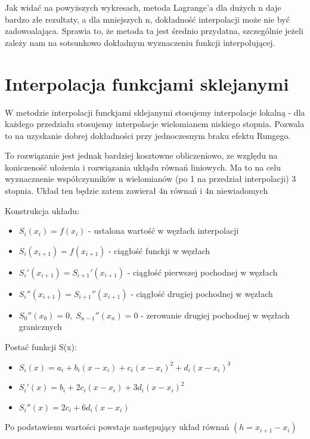 \documentclass[fleqn]{article}
\begin{document}
    \noindent Jak widać na powyższych wykresach, metoda Lagrange'a dla dużych n daje bardzo złe rezultaty, a dla mniejszych n, dokładność interpolacji może nie być zadowoalająca.
    Sprawia to, że metoda ta jest średnio przydatna, szczególnie jeżeli zależy nam na sotsunkowo dokładnym wyznaczeniu funkcji interpolującej.

\newpage
\section{Interpolacja funkcjami sklejanymi}
    W metodzie interpolacji funckjami sklejanymi stosujemy interpolacje lokalną - dla każdego przedziału stosujemy interpolacje wielomianem niskiego stopnia.
    Pozwala to na uzyskanie dobrej dokładności przy jednoczesnym braku efektu Rungego.

    \noindent To rozwiązanie jest jednak bardziej kosztowne obliczeniowo, ze względu na koniczeność ułożenia i rozwiązania ukłądu równań liniowych. 
    Ma to na celu wyznacznenie współczynników n wielomianów (po 1 na przedział interpolacji) 3 stopnia. Układ ten będzie zatem zawierał 4n równań i 4n niewiadomych

    \noindent Konstrukcja układu:
    \begin{itemize}
        \item $S_i(x_i) = f(x_i)$ - ustalona wartość w węzłach interpolacji
        \item $S_i(x_{i+1}) = f(x_{i+1})$ - ciągłość funckji w węzłach
        \item $S_i'(x_{i+1}) = S_{i+1}'(x_{i+1})$ - ciągłość pierwszej pochodnej w węzłach
        \item $S_i''(x_{i+1}) = S_{i+1}''(x_{i+1})$ - ciągłość drugiej pochodnej w węzłach
        \item $S_0''(x_0) = 0, \; S_{n-1}''(x_n) = 0 $ - zerowanie drugiej pochodnej w węzłach granicznych
    \end{itemize}

    \noindent Postać funkcji S(x):
    \begin{itemize}
        \item $S_i(x) = a_i + b_i(x - x_i) + c_i(x - x_i)^2 + d_i(x-x_i)^3 $
        \item $S_i'(x) = b_i + 2c_i(x - x_i) + 3d_i(x - x_i)^2 $
        \item $S_i''(x) = 2c_i + 6d_i(x-x_i) $
    \end{itemize}

    \noindent Po podstawienu wartości powstaje następujący układ równań $(h = x_{i+1} - x_i)$
\end{document}
